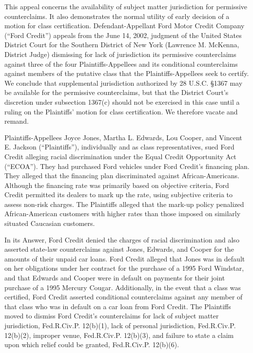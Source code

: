 \documentclass[11pt,letterpaper,twoside]{article}
\begin{document}
This appeal concerns the availability of subject matter jurisdiction for
permissive counterclaims. It also demonstrates the normal utility of
early decision of a motion for class certification. Defendant-Appellant
Ford Motor Credit Company (``Ford Credit'') appeals from the June 14,
2002, judgment of the United States District Court for the Southern
District of New York (Lawrence M. McKenna, District Judge) dismissing
for lack of jurisdiction its permissive counterclaims against three of
the four Plaintiffs-Appellees and its conditional counterclaims against
members of the putative class that the Plaintiffs-Appellees seek to
certify. We conclude that supplemental jurisdiction authorized by 28
U.S.C. §1367 may be available for the permissive counterclaims, but that
the District Court's discretion under subsection 1367(c) should not be
exercised in this case until a ruling on the Plaintiffs' motion for
class certification. We therefore vacate and remand.

Plaintiffs-Appellees Joyce Jones, Martha L. Edwards, Lou Cooper, and
Vincent E. Jackson (``Plaintiffs''), individually and as class
representatives, sued Ford Credit alleging racial discrimination under
the Equal Credit Opportunity Act (``ECOA''). They had purchased Ford
vehicles under Ford Credit's financing plan. They alleged that the
financing plan discriminated against African-Americans. Although the
financing rate was primarily based on objective criteria, Ford Credit
permitted its dealers to mark up the rate, using subjective criteria to
assess non-risk charges. The Plaintiffs alleged that the mark-up policy
penalized African-American customers with higher rates than those
imposed on similarly situated Caucasian customers.

In its Answer, Ford Credit denied the charges of racial discrimination
and also asserted state-law counterclaims against Jones, Edwards, and
Cooper for the amounts of their unpaid car loans. Ford Credit alleged
that Jones was in default on her obligations under her contract for the
purchase of a 1995 Ford Windstar, and that Edwards and Cooper were in
default on payments for their joint purchase of a 1995 Mercury Cougar.
Additionally, in the event that a class was certified, Ford Credit
asserted conditional counterclaims against any member of that class who
was in default on a car loan from Ford Credit. The Plaintiffs moved to
dismiss Ford Credit's counterclaims for lack of subject matter
jurisdiction, Fed.R.Civ.P. 12(b)(1), lack of personal jurisdiction,
Fed.R.Civ.P. 12(b)(2), improper venue, Fed.R.Civ.P. 12(b)(3), and
failure to state a claim upon which relief could be granted,
Fed.R.Civ.P. 12(b)(6).
\end{document}
